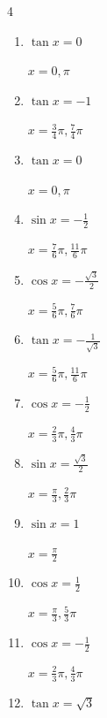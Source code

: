 \begin{multicols}{4}
\begin{enumerate}
  \item $\displaystyle \tan{x}  = 0$

        $\displaystyle x = 0 , \pi$

  \item $\displaystyle \tan{x}  = -1$

        $\displaystyle x = \frac{3}{4}\pi , \frac{7}{4}\pi$

  \item $\displaystyle \tan{x}  = 0$

        $\displaystyle x = 0 , \pi$

  \item $\displaystyle \sin{x}  = -\frac{1}{2}$

        $\displaystyle x = \frac{7}{6}\pi , \frac{11}{6}\pi$

  \item $\displaystyle \cos{x}  = -\frac{\sqrt{3}}{2}$

        $\displaystyle x = \frac{5}{6}\pi , \frac{7}{6}\pi$

  \item $\displaystyle \tan{x}  = -\frac{1}{\sqrt{3}}$

        $\displaystyle x = \frac{5}{6}\pi , \frac{11}{6}\pi$

  \item $\displaystyle \cos{x}  = -\frac{1}{2}$

        $\displaystyle x = \frac{2}{3}\pi , \frac{4}{3}\pi$

  \item $\displaystyle \sin{x}  = \frac{\sqrt{3}}{2}$

        $\displaystyle x = \frac{\pi}{3} , \frac{2}{3}\pi$

  \item $\displaystyle \sin{x}  = 1$

        $\displaystyle x = \frac{\pi}{2}$

  \item $\displaystyle \cos{x}  = \frac{1}{2}$

        $\displaystyle x = \frac{\pi}{3} , \frac{5}{3}\pi$

  \item $\displaystyle \cos{x}  = -\frac{1}{2}$

        $\displaystyle x = \frac{2}{3}\pi , \frac{4}{3}\pi$

\columnbreak %

  \item $\displaystyle \tan{x}  = \sqrt{3}$


\end{enumerate}
\end{multicols}
